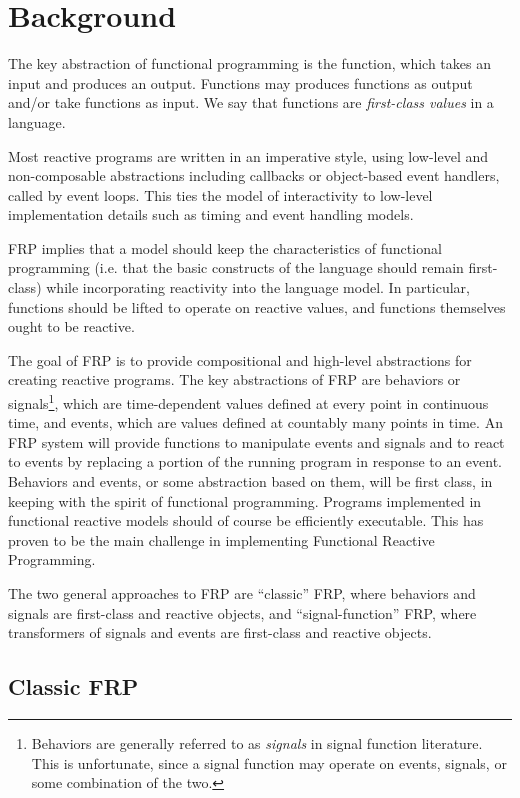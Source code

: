 \chapter{Background}
\label{chapter:Background}

The key abstraction of functional programming is the function, which takes an input and produces an output. Functions may produces functions
as output and/or take functions as input. We say that functions are {\em first-class values} in a language.

Most reactive programs are written in an imperative style, using low-level and non-composable abstractions including callbacks
or object-based event handlers, called by event loops. This ties the model of interactivity to low-level implementation details such as timing and event handling models. 

FRP implies that a model should keep the characteristics of functional programming (i.e. that the basic constructs of the language
should remain first-class) while incorporating reactivity into the language model. In particular, functions should be lifted to operate on reactive values,
and functions themselves ought to be reactive.

The goal of FRP is to provide compositional and high-level abstractions for creating reactive programs. The key
abstractions of FRP are behaviors or signals\footnote{Behaviors are generally referred to as {\em signals} in signal function literature. This is unfortunate, since a signal
function may operate on events, signals, or some combination of the two.}, which are time-dependent values defined at every point in continuous time, and events, which are 
values defined at countably many points in time. An FRP system will provide functions to manipulate events and signals and to react
to events by replacing a portion of the running program in response to an event. Behaviors and events, or some abstraction
based on them, will be first class, in keeping with the spirit of functional programming. Programs implemented in functional reactive
models should of course be efficiently executable. This has proven to be the main challenge in implementing Functional Reactive Programming.

The two general approaches to FRP are ``classic'' FRP, where behaviors and signals are first-class and reactive objects, and ``signal-function'' FRP,
where transformers of signals and events are first-class and reactive objects.

\section{Classic FRP}
\label{section:Background-classic_frp}

